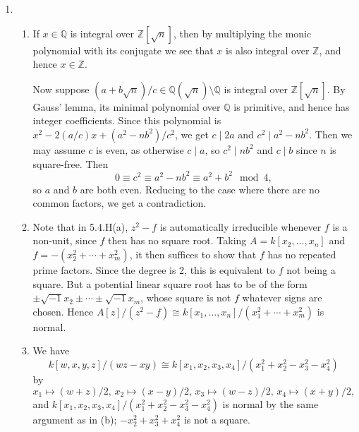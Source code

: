 \documentclass{report}
\newcommand{\divides}{\mathrel{\mid}} %
\newcommand{\Z}{\mathbb{Z}}
\newcommand{\Q}{\mathbb{Q}}
\begin{document}
\begin{enumerate}[label=\textbf{5.4.\Alph*.}]
	\item
	      \begin{enumerate}[label=(\alph*)]
		      \item If $x\in\Q$ is integral over $\Z[\sqrt n]$, then by
		            multiplying the monic polynomial with its conjugate we see that
		            $x$ is also integral over $\Z$, and hence $x\in\Z$.

		            Now suppose $(a+b\sqrt n)/c\in\Q(\sqrt n)\setminus\Q$ is
		            integral over $\Z[\sqrt n]$. By Gauss' lemma, its minimal
		            polynomial over $\Q$ is primitive, and hence has integer
		            coefficients. Since this polynomial is
		            $x^2-2(a/c)x+(a^2-nb^2)/c^2$, we get $c\divides2a$ and
		            $c^2\divides a^2-nb^2$. Then we may assume $c$ is even, as
		            otherwise $c\divides a$, so $c^2\divides nb^2$ and $c\divides b$
		            since $n$ is square-free. Then
		            \begin{equation*}
			            0 \equiv c^2 \equiv a^2-nb^2 \equiv a^2+b^2 \mod4,
		            \end{equation*}
		            so $a$ and $b$ are both even. Reducing to the case where there
		            are no common factors, we get a contradiction.

		      \item Note that in 5.4.H(a), $z^2-f$ is automatically irreducible
		            whenever $f$ is a non-unit, since $f$ then has no square root.
		            Taking $A=k[x_2,\ldots,x_n]$ and $f=-(x_2^2+\cdots+x_m^2)$, it
		            then suffices to show that $f$ has no repeated prime factors.
		            Since the degree is 2, this is equivalent to $f$ not being a
		            square. But a potential linear square root has to be of the form
		            $\pm\sqrt{-1}x_2\pm\cdots\pm\sqrt{-1}x_m$, whose square is not
		            $f$ whatever signs are chosen. Hence
		            $A[z]/(z^2-f)\cong k[x_1,\ldots,x_n]/(x_1^2+\cdots+x_m^2)$ is
		            normal.

		      \item We have
		            \begin{equation*}
			            k[w,x,y,z]/(wz-xy)
			            \cong k[x_1,x_2,x_3,x_4]/(x_1^2+x_2^2-x_3^2-x_4^2)
		            \end{equation*}
		            by
		            \begin{equation*}
			            x_1 \mapsto (w+z)/2,\,
			            x_2 \mapsto (x-y)/2,\,
			            x_3 \mapsto (w-z)/2,\,
			            x_4 \mapsto (x+y)/2,
		            \end{equation*}
		            and $k[x_1,x_2,x_3,x_4]/(x_1^2+x_2^2-x_3^2-x_4^2)$ is normal by
		            the same argument as in (b); $-x_2^2+x_3^2+x_4^2$ is not a
		            square.
	      \end{enumerate}


\end{enumerate}
\end{document}

